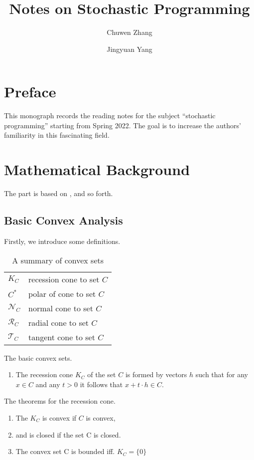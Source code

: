 \documentclass{beamerswitch}
\title{Notes on Stochastic Programming}
\theoremstyle{definition}
\begin{document}
\author[1]{\small Chuwen Zhang}
\author[1]{\small Jingyuan Yang}

\maketitle
\section{Preface}

This monograph records the reading notes for the subject ``stochastic programming'' starting from Spring 2022. The goal is to increase the authors' familiarity in this fascinating field.
\section{Mathematical Background}
The part is based on \cite{shapiro_lectures_2014}, \cite{birge_introduction_2011} and so forth.
\subsection{Basic Convex Analysis}

Firstly, we introduce some definitions.
\begin{table}[h!]
    \centering
    \begin{tabular}{l|l}
        \(K_C\)          & recession cone  to set \(C\) \\
        \(C^*\)          & polar of cone to set \(C\)   \\
        \(\mathcal N_C\) & normal cone to set \(C\)     \\
        \(\mathcal R_C\) & radial cone to set \(C\)     \\
        \(\mathcal T_C\) & tangent cone to set \(C\)
    \end{tabular}
    \caption{A summary of convex sets}
\end{table}
\begin{definition} The basic convex sets.

    \begin{enumerate}[i]
        \item The recession cone \(K_C\) of the set \(C\) is formed by vectors \(h\) such that for any \(x \in C\) and any \(t > 0\) it follows that \(x + t\cdot h \in C\).
    \end{enumerate}

\end{definition}
\begin{theorem} The theorems for the recession cone.
    \begin{enumerate}[i]
        \item The \(K_C\) is convex if \(C\) is convex,
        \item and is closed if the set C is closed.
        \item The convex set C is bounded iff. \(K_C = \{0\}\)
    \end{enumerate}
\end{theorem}
\end{document}
